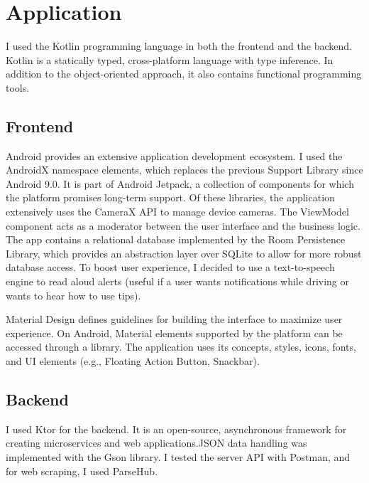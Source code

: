 \pagebreak
\section{Application}

I used the Kotlin programming language\cite{Kotlin} in both the frontend and the backend. Kotlin is a statically typed, cross-platform language with type inference. In addition to the object-oriented approach, it also contains functional programming tools.

\subsection{Frontend}

Android provides an extensive application development ecosystem. I used the AndroidX namespace elements, which replaces the previous Support Library since Android 9.0. It is part of Android Jetpack, a collection of components for which the platform promises long-term support. Of these libraries, the application extensively uses the CameraX API to manage device cameras. The ViewModel component acts as a moderator between the user interface and the business logic. The app contains a relational database implemented by the Room Persistence Library, which provides an abstraction layer over SQLite to allow for more robust database access. To boost user experience, I decided to use a text-to-speech engine to read aloud alerts (useful if a user wants notifications while driving or wants to hear how to use tips). 

Material Design defines guidelines for building the interface to maximize user experience. On Android, Material elements supported by the platform can be accessed through a library. The application uses its concepts, styles, icons, fonts, and UI elements (e.g., Floating Action Button, Snackbar).

\subsection{Backend}

I used Ktor\cite{Ktor} for the backend. It is an open-source, asynchronous framework for creating microservices and web applications.JSON data handling was implemented with the Gson library. I tested the server API with Postman, and for web scraping, I used ParseHub.

